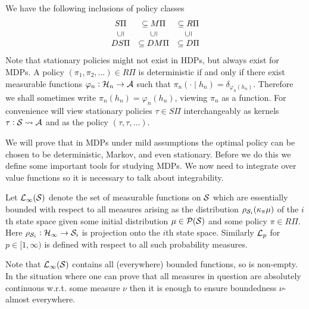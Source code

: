 \begin{rem} 
  We have the following inclusions of policy classes
  \[ \begin{matrix}
      S\Pi &\subseteq M\Pi &\subseteq R\Pi
      \\ \rleft{\subseteq} & \rleft{\subseteq} & \rleft{\subseteq} 
      \\ DS\Pi &\subseteq DM\Pi &\subseteq D\Pi
  \end{matrix} \] 
  Note that stationary policies might not exist
  in HDPs, but always exist for MDPs.
  A policy $(\pi_1, \pi_2, \dots) \in R\Pi$ is deterministic
  if and only if there exist measurable
  functions $\varphi_n : \mathcal{H}_n \to \mathcal{A}$ such that
  $\pi_n(\cdot \mid h_n) = \delta_{\varphi_n(h_n)}$. Therefore we shall sometimes
  write $\pi_n(h_n) = \varphi_n(h_n)$, viewing $\pi_n$ as a function.
  For convenience
  will view stationary policies $\tau \in S\Pi$ interchangeably as kernels
  $\tau : \mathcal{S} \leadsto \mathcal{A}$ and as the policy
  $(\tau, \tau, \dots)$.
\end{rem}

We will prove that in MDPs under mild assumptions the optimal policy
can be chosen to be deterministic, Markov, and even stationary.
Before we do this we define some important tools for studying MDPs.
We now need to integrate over value functions so it is
necessary to talk about integrability.

\begin{defn}
  Let $\mathcal{L}_\infty(\mathcal{S})$ denote the set of
  measurable functions on $\mathcal{S}$ which are
  essentially bounded with respect to all measures
  arising as the distribution $\rho_{\mathcal{S}_i}(\kappa_\pi \mu)$
  of the $i$th state space given some initial
  distribution $\mu \in \mathcal{P}(\mathcal{S})$ and some policy $\pi \in R\Pi$.
  Here $\rho_{\mathcal{S}_i} : \mathcal{H}_\infty \to \mathcal{S}_i$ is projection
  onto the $i$th state space.
  Similarly $\mathcal{L}_p$ for $p \in [1,\infty)$ is defined with respect to
  all such probability measures.
  \label{defn:essBound}
\end{defn}
\begin{rem}
  Note that $\mathcal{L}_\infty(\mathcal{S})$ contains all (everywhere) bounded
  functions, so is non-empty.
  In the situation where one can prove that all
  measures in question are absolutely continuous w.r.t. some measure
  $\nu$ then it is enough to ensure boundedness $\nu$-almost everywhere.
\end{rem}

